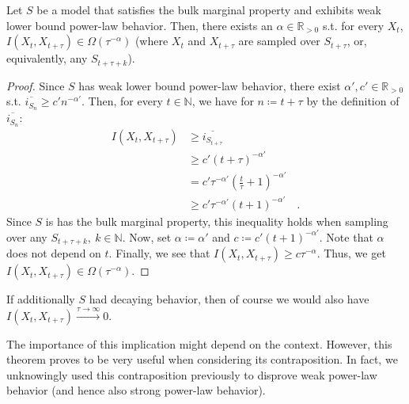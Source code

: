\documentclass[../../main.tex]{subfiles}
\begin{document}
    \begin{theorem}
        \label{theorem:power_law_decay_in_well-behaved_models_with_weak_power-law_behavior}
        Let $S$ be a model that satisfies the bulk marginal property and exhibits weak lower bound power-law behavior. Then, there exists an $\alpha \in \mathbb{R}_{>0}$ s.t. for every $X_t$, $I(X_{t}, X_{t + \tau}) \in \Omega(\tau^{-\alpha})$ (where $X_t$ and $X_{t + \tau}$ are sampled over $S_{t + \tau}$, or, equivalently, any $S_{t + \tau + k}$).
    \end{theorem}
    \vspace{-2.5em}
    \begin{proof}
        Since $S$ has weak lower bound power-law behavior, there exist $\alpha', c' \in \mathbb{R}_{>0}$ s.t. $\overline{i_{S_n}} \geq c' n^{-\alpha'}$. Then, for every $t \in \mathbb{N}$, we have for $n \coloneqq t + \tau$ by the definition of $\overline{i_{S_n}}$:
        \begin{align*}
            I(X_{t}, X_{t + \tau}) &\geq \overline{i_{S_{t + \tau}}} \\
            &\geq c' (t + \tau)^{-\alpha'} \\
            &= c' \tau^{-\alpha'} (\frac{t}{\tau} + 1)^{-\alpha'} \\
            &\geq c' \tau^{-\alpha'} (t + 1)^{-\alpha'} \quad .
        \end{align*}
        Since $S$ is has the bulk marginal property, this inequality holds when sampling over any $S_{t + \tau + k}, \ k \in \mathbb{N}$. Now, set $\alpha \coloneqq \alpha'$ and $c \coloneqq c' (t + 1)^{-\alpha'}$. Note that $\alpha$ does not depend on $t$. Finally, we see that $I(X_{t}, X_{t + \tau}) \geq c \tau^{-\alpha}$. Thus, we get $I(X_{t}, X_{t + \tau}) \in \Omega(\tau^{-\alpha})$.
    \end{proof}

    \begin{remark}
        If additionally $S$ had decaying behavior, then of course we would also have $I(X_{t}, X_{t + \tau}) \xrightarrow{\tau \to \infty} 0$.
    \end{remark}

    \begin{remark}
        The importance of this implication might depend on the context. However, this theorem proves to be very useful when considering its contraposition. In fact, we unknowingly used this contraposition previously to disprove weak power-law behavior (and hence also strong power-law behavior).
    \end{remark}
\end{document}
